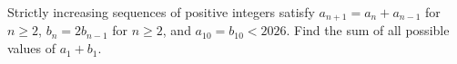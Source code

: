 Strictly increasing sequences of positive integers satisfy $a_{n+1}=a_n+a_{n-1}$ for $n\ge2$, $b_n=2b_{n-1}$ for $n\ge2$, and $a_{10}=b_{10}<2026$. Find the sum of all possible values of $a_1+b_1$.
